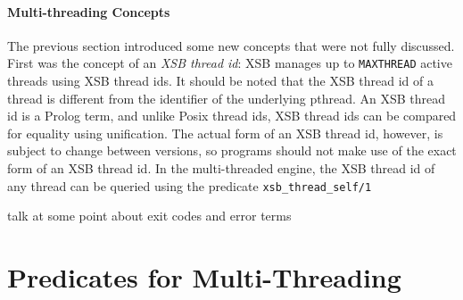 {\paragraph{Multi-threading Concepts}

The previous section introduced some new concepts that were not fully
discussed.  First was the concept of an {\em XSB thread id}: XSB
manages up to {\tt MAXTHREAD} active threads using XSB thread ids.  It
should be noted that the XSB thread id of a thread is different from
the identifier of the underlying pthread.  An XSB thread id is a
Prolog term, and unlike Posix thread ids, XSB thread ids can be
compared for equality using unification.  The actual form of an XSB
thread id, however, is subject to change between versions, so programs
should not make use of the exact form of an XSB thread id.  In the
multi-threaded engine, the XSB thread id of any thread can be queried
using the predicate {\tt xsb\_thread\_self/1}

{\sc talk at some point about exit codes and error terms}
}

\section{Predicates for Multi-Threading}

